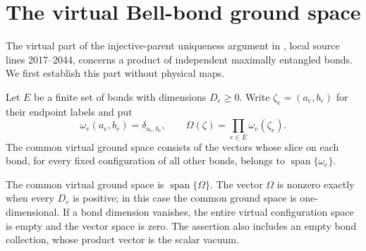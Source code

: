 \section{The virtual Bell-bond ground space}%
\label{sec:peps_virtual_bond_ground_space}

The virtual part of the injective-parent uniqueness argument in
\cite[Section~IV.C.1]{Cirac2021Matrix}, local source lines 2017--2044,
concerns a product of independent maximally entangled bonds.
We first establish this part without physical maps.

\begin{definition}%
    \label{def:peps_virtual_bond_ground_space}
    \leanok
    Let $E$ be a finite set of bonds with dimensions $D_e\ge0$.
    Write $\zeta_e=(a_e,b_e)$ for their endpoint labels and put
    \[
        \omega_e(a_e,b_e)=\delta_{a_e,b_e},\qquad
        \Omega(\zeta)=\prod_{e\in E}\omega_e(\zeta_e).
    \]
    The common virtual ground space consists of the vectors whose
    slice on each bond, for every fixed configuration of all
    other bonds, belongs to $\operatorname{span}\{\omega_e\}$.
\end{definition}

\begin{lemma}%
    \label{thm:peps_virtual_bond_ground_space}
    \leanok
    The common virtual ground space is
    $\operatorname{span}\{\Omega\}$.
    The vector $\Omega$ is nonzero exactly when every $D_e$ is
    positive; in this case the common ground space is one-dimensional.
    If a bond dimension vanishes, the entire virtual configuration
    space is empty and the vector space is zero.
    The assertion also includes an empty bond collection, whose
    product vector is the scalar vacuum.
\end{lemma}

